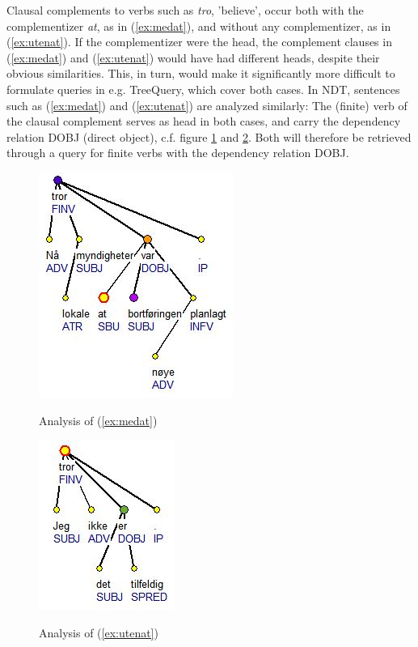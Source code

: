 \documentclass[11pt,a4paper]{article}
\begin{document}
Clausal complements to verbs such as \emph{tro}, 'believe', occur both with the complementizer \emph{at}, as in (\ref{ex:medat}), and without any complementizer, as in (\ref{ex:utenat}). If the complementizer were the head, the complement clauses in (\ref{ex:medat}) and (\ref{ex:utenat}) would have had different heads, despite their obvious similarities. This, in turn, would make it significantly more difficult to formulate queries in e.g. TreeQuery, which cover both cases.
In NDT, sentences such as (\ref{ex:medat}) and (\ref{ex:utenat}) are analyzed similarly: The (finite) verb of the clausal complement serves as head in both cases, and carry the dependency relation DOBJ (direct object), c.f. figure \ref{figure:medat} and \ref{figure:utenat}. Both will therefore be retrieved through a query for finite verbs with the dependency relation DOBJ.

\begin{figure}[h!]
  \caption{Analysis of (\ref{ex:medat})}
  \centering
    \includegraphics{medat.jpg}
\label{figure:medat}
\end{figure}

\begin{figure}[h!]
  \caption{Analysis of (\ref{ex:utenat})}
  \centering
    \includegraphics{utenat.jpg}
\label{figure:utenat}
\end{figure}
\end{document}
